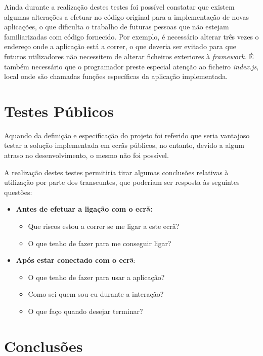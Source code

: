 	Ainda durante a realização destes testes foi possível constatar que existem algumas alterações a efetuar no código original para a implementação de novas aplicações, o que dificulta o trabalho de futuras pessoas que não estejam familiarizadas com código fornecido. Por exemplo, é necessário alterar três vezes o endereço onde a aplicação está a correr, o que deveria ser evitado para que futuros utilizadores não necessitem de alterar ficheiros exteriores à \textit{framework}. É também necessário que o programador preste especial atenção ao ficheiro \textit{index.js}, local onde são chamadas funções específicas da aplicação implementada. 

\section{Testes Públicos}

	Aquando da definição e especificação do projeto foi referido que seria vantajoso testar a solução implementada em ecrãs públicos, no entanto, devido a algum atraso no desenvolvimento, o mesmo não foi possível.

	A realização destes testes permitiria tirar algumas conclusões relativas à utilização por parte dos transeuntes, que poderiam ser resposta às seguintes questões:

	\begin{itemize}
	\item \textbf{Antes de efetuar a ligação com o ecrã:}
		\begin{itemize}
		\item Que riscos estou a correr se me ligar a este ecrã?
		\item O que tenho de fazer para me conseguir ligar?
		\end{itemize}
	\item \textbf{Após estar conectado com o ecrã}:
		\begin{itemize}
		\item O que tenho de fazer para usar a aplicação?
		\item Como sei quem sou eu durante a interação?
		\item O que faço quando desejar terminar?
		\end{itemize}
	\end{itemize} 

\section{Conclusões}

